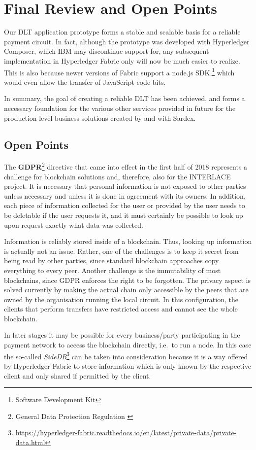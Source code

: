 \section{Final Review and Open Points}

Our DLT application prototype forms a stable and scalable basis for a reliable payment circuit. In fact, although the prototype was developed with Hyperledger Composer, which IBM may discontinue support for, any subsequent implementation in Hyperledger Fabric only will now be much easier to realize. This is also because newer versions of Fabric support a node.js SDK,\footnote{Software Development Kit} which would even allow the transfer of JavaScript code bits.

In summary, the goal of creating a reliable DLT has been achieved, and forms a necessary foundation for the various other services provided in future for the production-level business solutions created by and with Sardex.

\subsection{Open Points}

The \textbf{GDPR}\footnote{General Data Protection Regulation \cite{GDPR}} directive that came into effect in the first half of 2018 represents a challenge for blockchain solutions and, therefore, also for the INTERLACE project. It is necessary that personal information is not exposed to other parties unless necessary and unless it is done in agreement with its owners. In addition, each piece of information collected for the user or provided by the user needs to be deletable if the user requests it, and it must certainly be possible to look up upon request exactly what data was collected.

Information is reliably stored inside of a blockchain. Thus, looking up information is actually not an issue. Rather, one of the challenges is to keep it secret from being read by other parties, since standard blockchain approaches copy everything to every peer. Another challenge is the immutability of most blockchains, since GDPR enforces the right to be forgotten. The privacy aspect is solved currently by making the actual chain only accessible by the peers that are owned by the organisation running the local circuit. In this configuration, the clients that perform transfers have restricted access and cannot see the whole blockchain.

In later stages it may be possible for every business/party participating in the payment network to access the blockchain directly, i.e.\ to run a node. In this case the so-called \textit{SideDB}\footnote{\url{https://hyperledger-fabric.readthedocs.io/en/latest/private-data/private-data.html}} can be taken into consideration because it is a way offered by Hyperledger Fabric to store information which is only known by the respective client and only shared if permitted by the client.


